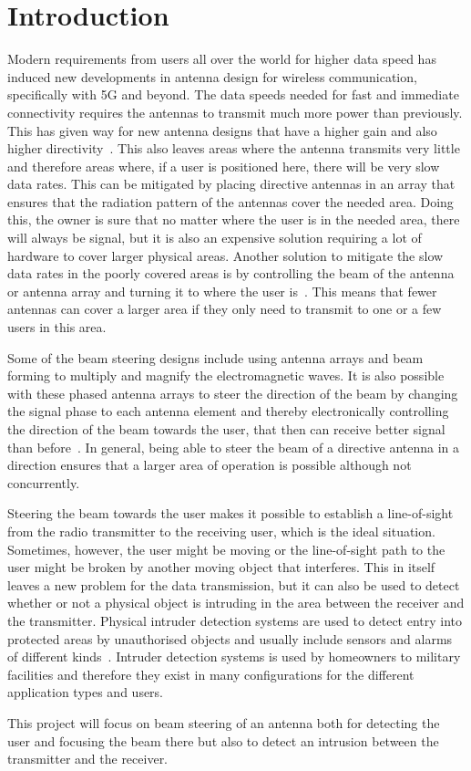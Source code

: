 \chapter{Introduction}
Modern requirements from users all over the world for higher data speed has induced new developments in antenna design for wireless communication, specifically with 5G and beyond. The data speeds needed for fast and immediate connectivity requires the antennas to transmit much more power than previously. This has given way for new antenna designs that have a higher gain and also higher directivity~\cite{beamsteering}. This also leaves areas where the antenna transmits very little and therefore areas where, if a user is positioned here, there will be very slow data rates. This can be mitigated by placing directive antennas in an array that ensures that the radiation pattern of the antennas cover the needed area. Doing this, the owner is sure that no matter where the user is in the needed area, there will always be signal, but it is also an expensive solution requiring a lot of hardware to cover larger physical areas. Another solution to mitigate the slow data rates in the poorly covered areas is by controlling the beam of the antenna or antenna array and turning it to where the user is~\cite{beamsteering}. This means that fewer antennas can cover a larger area if they only need to transmit to one or a few users in this area. 

Some of the beam steering designs include using antenna arrays and beam forming to multiply and magnify the electromagnetic waves. It is also possible with these phased antenna arrays to steer the direction of the beam by changing the signal phase to each antenna element and thereby electronically controlling the direction of the beam towards the user, that then can receive better signal than before~\cite{beamsteering}. In general, being able to steer the beam of a directive antenna in a direction ensures that a larger area of operation is possible although not concurrently.

Steering the beam towards the user makes it possible to establish a line-of-sight from the radio transmitter to the receiving user, which is the ideal situation. Sometimes, however, the user might be moving or the line-of-sight path to the user might be broken by another moving object that interferes. This in itself leaves a new problem for the data transmission, but it can also be used to detect whether or not a physical object is intruding in the area between the receiver and the transmitter. Physical intruder detection systems are used to detect entry into protected areas by unauthorised objects and usually include sensors and alarms of different kinds~\cite{ids}. Intruder detection systems is used by homeowners to military facilities and therefore they exist in many configurations for the different application types and users.

This project will focus on beam steering of an antenna both for detecting the user and focusing the beam there but also to detect an intrusion between the transmitter and the receiver.